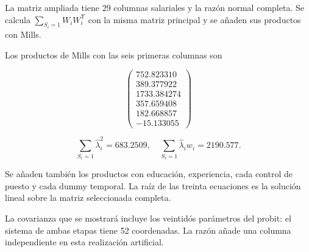\documentclass[11pt,a4paper]{article}
\begin{document}
La matriz ampliada tiene 29 columnas salariales y la razón normal completa. Se calcula
$\sum_{S_i=1}W_iW_i^{\mathsf T}$ con la misma matriz principal y se añaden sus productos con Mills.

Los productos de Mills con las seis primeras columnas son

\[
\begin{pmatrix}752.823310\\389.377922\\1733.384274\\357.659408\\182.668857\\-15.133055\end{pmatrix}
\]

\[
\sum_{S_i=1}\widehat\lambda_i^2=683.2509,\quad
\sum_{S_i=1}\widehat\lambda_iw_i=2190.577.
\]

Se añaden también los productos con educación, experiencia, cada control de puesto y cada dummy temporal. La raíz de las treinta ecuaciones es la solución lineal sobre la matriz seleccionada completa.

La covarianza que se mostrará incluye los veintidós parámetros del probit: el sistema de ambas etapas tiene 52 coordenadas. La razón añade una columna independiente en esta realización artificial.

\clearpage
\end{document}
